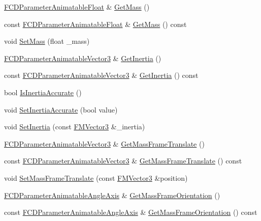 \begin{DoxyCompactItemize}
\item 
\hyperlink{classFCDParameterAnimatableT}{FCDParameterAnimatableFloat} \& \hyperlink{classFCDPhysicsRigidBodyParameters_a1508986eccd8dcec06562902167f31ae}{GetMass} ()
\item 
const \hyperlink{classFCDParameterAnimatableT}{FCDParameterAnimatableFloat} \& \hyperlink{classFCDPhysicsRigidBodyParameters_ab8a7aa39e9aac022fd24e14537cd23ba}{GetMass} () const 
\item 
void \hyperlink{classFCDPhysicsRigidBodyParameters_af06d1b1c8225f331c5d5153679d180d3}{SetMass} (float \_\-mass)
\item 
\hyperlink{classFCDParameterAnimatableT}{FCDParameterAnimatableVector3} \& \hyperlink{classFCDPhysicsRigidBodyParameters_a8c7ac7c8afd4c7ec4f87c6597900d8ae}{GetInertia} ()
\item 
const \hyperlink{classFCDParameterAnimatableT}{FCDParameterAnimatableVector3} \& \hyperlink{classFCDPhysicsRigidBodyParameters_a5a12beb9dbdb9c7846a5f12576f06e71}{GetInertia} () const 
\item 
bool \hyperlink{classFCDPhysicsRigidBodyParameters_ada7b8d9560c63d88b7eaa4ec35dcb321}{IsInertiaAccurate} ()
\item 
void \hyperlink{classFCDPhysicsRigidBodyParameters_ac3ba44278eb17678388fbe89a0f8d8b6}{SetInertiaAccurate} (bool value)
\item 
void \hyperlink{classFCDPhysicsRigidBodyParameters_ac94d541f793f032ff1cb9b58219b300f}{SetInertia} (const \hyperlink{classFMVector3}{FMVector3} \&\_\-inertia)
\item 
\hyperlink{classFCDParameterAnimatableT}{FCDParameterAnimatableVector3} \& \hyperlink{classFCDPhysicsRigidBodyParameters_a1cefbe360a56cbbb7e4c2894525b22c4}{GetMassFrameTranslate} ()
\item 
const \hyperlink{classFCDParameterAnimatableT}{FCDParameterAnimatableVector3} \& \hyperlink{classFCDPhysicsRigidBodyParameters_a80b31b591707b6bb77cadcc2b75afb26}{GetMassFrameTranslate} () const 
\item 
void \hyperlink{classFCDPhysicsRigidBodyParameters_a01fb133c138e40bfa12093ea56cc3fd7}{SetMassFrameTranslate} (const \hyperlink{classFMVector3}{FMVector3} \&position)
\item 
\hyperlink{classFCDParameterAnimatableT}{FCDParameterAnimatableAngleAxis} \& \hyperlink{classFCDPhysicsRigidBodyParameters_a52a353de8236e360d31849a6609414a7}{GetMassFrameOrientation} ()
\item 
const \hyperlink{classFCDParameterAnimatableT}{FCDParameterAnimatableAngleAxis} \& \hyperlink{classFCDPhysicsRigidBodyParameters_a8de1ae0f7c6e4fbfe178cb5526cd5cea}{GetMassFrameOrientation} () const 

\end{DoxyCompactItemize}
